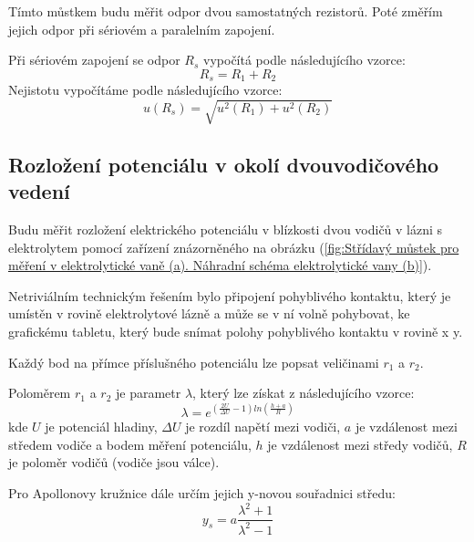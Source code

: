 \documentclass[a4paper,11pt]{article}
\begin{document}
\begin{minipage}[]{0.5\textwidth}
        Tímto můstkem budu měřit odpor dvou samostatných rezistorů. Poté změřím jejich odpor při sériovém a paralelním zapojení.
        \par Při sériovém zapojení se odpor $R_s$ vypočítá podle následujícího vzorce: 
        \begin{equation}
            R_s = R_1 + R_2
        \end{equation}
        Nejistotu vypočítáme podle následujícího vzorce: 
        \begin{equation}
            u(R_s) = \sqrt{u^2(R_1)+u^2(R_2)}
        \end{equation}

        \subsection{Rozložení potenciálu v okolí dvouvodičového vedení}
        Budu měřit rozložení elektrického potenciálu v blízkosti dvou vodičů v lázni s elektrolytem pomocí zařízení znázorněného na obrázku (\ref{fig:Střídavý můstek pro měření v elektrolytické vaně (a). Náhradní schéma elektrolytické vany (b)}).
            \par Netriviálním technickým řešením bylo připojení pohyblivého kontaktu, který je umístěn v rovině elektrolytové lázně a může se v ní volně pohybovat, ke grafickému tabletu, který bude snímat polohy pohyblivého kontaktu v rovině x y. 
            \par Každý bod na přímce příslušného potenciálu lze popsat veličinami $r_1$ a $r_2$. 
            \par Poloměrem $r_1$ a $r_2$ je parametr $\lambda$, který lze získat z následujícího vzorce: 
            \begin{equation}
                \lambda = e^{(\frac{2U}{\Delta U} -1)ln(\frac{h+a}{R})}
            \end{equation}
            kde $U$ je potenciál hladiny, $\Delta U$ je rozdíl napětí mezi vodiči, $a$ je vzdálenost mezi středem vodiče a bodem měření potenciálu, $h$ je vzdálenost mezi středy vodičů, $R$ je poloměr vodičů (vodiče jsou válce).
            \par Pro Apollonovy kružnice dále určím jejich y-novou souřadnici středu:
            \begin{equation}
                y_s = a \frac{\lambda^2 + 1}{\lambda^2 - 1}
            \end{equation}
            \begin{equation}

\end{equation}
\end{minipage}
\end{document}
